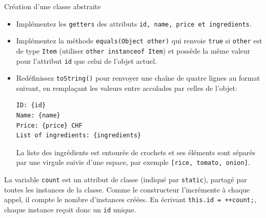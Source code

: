\begin{Exercice}[15 minutes]{Création d'une classe abstraite}
\begin{itemize}
		\item Implémentez les \lstinline{getters} des attributs \lstinline{id, name, price et ingredients}.
		\item Implémentez la méthode \lstinline{equals(Object other)} qui renvoie \lstinline|true| si \lstinline|other| est de type \lstinline|Item| (utiliser \lstinline|other instanceof Item|) et possède la même valeur pour l'attribut \lstinline{id} que celui de l'objet actuel.
		\item Redéfinissez \lstinline{toString()} pour renvoyer une chaîne de quatre lignes au format suivant, en remplaçant les valeurs entre accolades par celles de l'objet:
		\begin{lstlisting}[language=texte,numbers=none]
ID: {id}
Name: {name}
Price: {price} CHF
List of ingredients: {ingredients}
\end{lstlisting}
		La liste des ingrédients est entourée de crochets et ses éléments sont séparés par une virgule suivie d'une espace, par exemple \lstinline{[rice, tomato, onion]}.
	
\end{itemize}
		\begin{solution}  
			
		\end{solution}
		\begin{solution}
			La variable \lstinline{count} est un attribut de classe (indiqué par \lstinline{static}), partagé par toutes les instances de la classe. Comme le constructeur l'incrémente à chaque appel, il compte le nombre d'instances créées. En écrivant \lstinline{this.id = ++count;}, chaque instance reçoit donc un \lstinline{id} unique.
		\end{solution}
	\end{Exercice}
	
